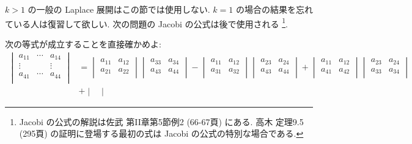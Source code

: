 \documentclass[12pt,twoside]{jarticle}
\begin{document}
\medskip

$k>1$ の一般の Laplace 展開はこの節では使用しない.
$k=1$ の場合の結果を忘れている人は復習して欲しい.
次の問題の Jacobi の公式は後で使用される%
\footnote{Jacobi の公式の解説は佐武 \cite{satake} 第II章第5節例2 (66-67頁)
  にある.  高木 \cite{takagi1} 定理9.5 (295頁) の証明に登場する最初の式は
  Jacobi の公式の特別な場合である.}.


\begin{question}
  次の等式が成立することを直接確かめよ:
  {\small
  \begin{align*}
    \begin{vmatrix}
      a_{11} & \cdots & a_{14} \\
      \vdots &        & \vdots \\
      a_{41} & \cdots & a_{44} \\
    \end{vmatrix}
    & =
    \begin{vmatrix}
      a_{11} & a_{12} \\
      a_{21} & a_{22} \\
    \end{vmatrix}
    \begin{vmatrix}
      a_{33} & a_{34} \\
      a_{43} & a_{44} \\
    \end{vmatrix}
    -
    \begin{vmatrix}
      a_{11} & a_{12} \\
      a_{31} & a_{32} \\
    \end{vmatrix}
    \begin{vmatrix}
      a_{23} & a_{24} \\
      a_{43} & a_{44} \\
    \end{vmatrix}
    +
    \begin{vmatrix}
      a_{11} & a_{12} \\
      a_{41} & a_{42} \\
    \end{vmatrix}
    \begin{vmatrix}
      a_{23} & a_{24} \\
      a_{33} & a_{34} \\
    \end{vmatrix}
    \\ &
    +
    \begin{vmatrix}

\end{vmatrix}
\end{align*}}
\end{question}
\end{document}
